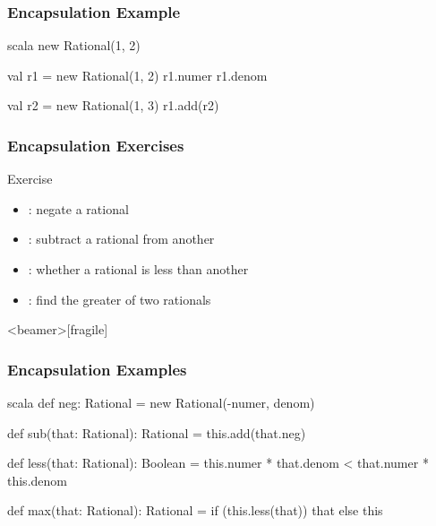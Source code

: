 \documentclass[dvipsnames]{beamer}
\theoremstyle{plain}
\begin{document}
\begin{frame}[fragile]
  \frametitle{Encapsulation Example}

  \begin{example}[Scala]
    \begin{pygments}{scala}
new Rational(1, 2)

val r1 = new Rational(1, 2)
r1.numer
r1.denom

val r2 = new Rational(1, 3)
r1.add(r2)
    \end{pygments}
  \end{example}
\end{frame}

\begin{frame}
  \frametitle{Encapsulation Exercises}

  \begin{block}{Exercise}
    \begin{itemize}
      \item {}: negate a rational
      \item {}: subtract a rational from another
      \item {}: whether a rational is less than another
      \item {}: find the greater of two rationals
    \end{itemize}
  \end{block}
\end{frame}

\begin{frame}<beamer>[fragile]
  \frametitle{Encapsulation Examples}

  \begin{example}[Scala]
    \begin{pygments}{scala}
    def neg: Rational =
        new Rational(-numer, denom)

    def sub(that: Rational): Rational =
        this.add(that.neg)

    def less(that: Rational): Boolean =
        this.numer * that.denom < that.numer * this.denom

    def max(that: Rational): Rational =
        if (this.less(that)) that else this
    \end{pygments}
  \end{example}
\end{frame}
\end{document}
